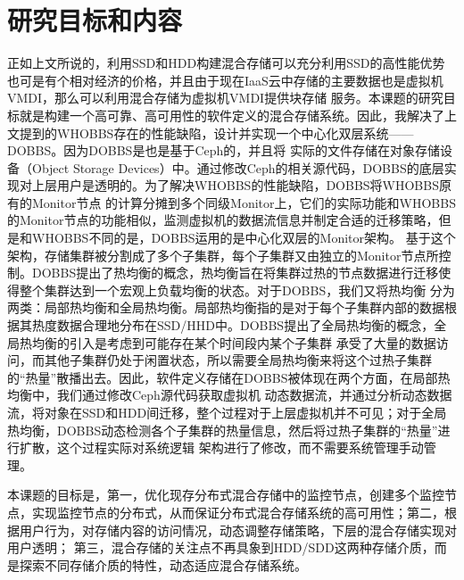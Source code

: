\section{研究目标和内容}
正如上文所说的，利用SSD和HDD构建混合存储可以充分利用SSD的高性能优势也可是有个相对经济的价格，并且由于现在IaaS云中存储的主要数据也是虚拟机VMDI，那么可以利用混合存储为虚拟机VMDI提供块存储
服务。本课题的研究目标就是构建一个高可靠、高可用性的软件定义的混合存储系统。因此，我解决了上文提到的WHOBBS存在的性能缺陷，设计并实现一个中心化双层系统——DOBBS。因为DOBBS是也是基于Ceph的，并且将
实际的文件存储在对象存储设备（Object Storage Devices）中。通过修改Ceph的相关源代码，DOBBS的底层实现对上层用户是透明的。为了解决WHOBBS的性能缺陷，DOBBS将WHOBBS原有的Monitor节点
的计算分摊到多个同级Monitor上，它们的实际功能和WHOBBS的Monitor节点的功能相似，监测虚拟机的数据流信息并制定合适的迁移策略，但是和WHOBBS不同的是，DOBBS运用的是中心化双层的Monitor架构。
基于这个架构，存储集群被分割成了多个子集群，每个子集群又由独立的Monitor节点所控制。DOBBS提出了热均衡的概念，热均衡旨在将集群过热的节点数据进行迁移使得整个集群达到一个宏观上负载均衡的状态。对于DOBBS，我们又将热均衡
分为两类：局部热均衡和全局热均衡。局部热均衡指的是对于每个子集群内部的数据根据其热度数据合理地分布在SSD/HHD中。DOBBS提出了全局热均衡的概念，全局热均衡的引入是考虑到可能存在某个时间段内某个子集群
承受了大量的数据访问，而其他子集群仍处于闲置状态，所以需要全局热均衡来将这个过热子集群的“热量”散播出去。因此，软件定义存储在DOBBS被体现在两个方面，在局部热均衡中，我们通过修改Ceph源代码获取虚拟机
动态数据流，并通过分析动态数据流，将对象在SSD和HDD间迁移，整个过程对于上层虚拟机并不可见；对于全局热均衡，DOBBS动态检测各个子集群的热量信息，然后将过热子集群的“热量”进行扩散，这个过程实际对系统逻辑
架构进行了修改，而不需要系统管理手动管理。

本课题的目标是，第一，优化现存分布式混合存储中的监控节点，创建多个监控节点，实现监控节点的分布式，从而保证分布式混合存储系统的高可用性；第二，根据用户行为，对存储内容的访问情况，动态调整存储策略，下层的混合存储实现对用户透明；
第三，混合存储的关注点不再具象到HDD/SDD这两种存储介质，而是探索不同存储介质的特性，动态适应混合存储系统。

